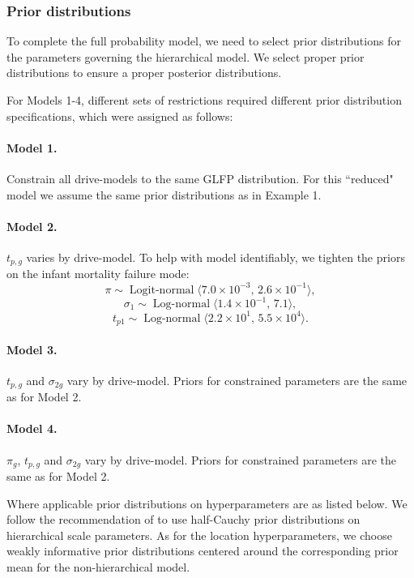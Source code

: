 \documentclass[aoas]{imsart}
\newcommand{\op}{\operatorname}
\begin{document}
\subsubsection{Prior distributions}
\label{sec:Prior distributions}
To complete the full probability model, we need to select prior distributions for the parameters governing the hierarchical model. We select proper prior distributions to ensure a proper posterior distributions.

For Models 1-4, different sets of restrictions required different prior distribution specifications, which were assigned as follows:

\paragraph{Model 1.} Constrain all drive-models to the same GLFP distribution. For this ``reduced" model we assume the same prior distributions as in Example 1.

\paragraph{Model 2.} $t_{p,g}$ varies by drive-model. To help with model identifiably, we tighten the priors on the infant mortality failure mode:
$$ \pi \sim \op{Logit-normal}\langle 7.0\times 10^{-3},\, 2.6 \times 10^{-1} \rangle,$$
$$\sigma_1 \sim \op{Log-normal}\langle 1.4 \times 10^{-1},\, 7.1\rangle,$$ 
$$t_{p1} \sim \op{Log-normal} \langle 2.2 \times 10^1,\, 5.5 \times 10^{4} \rangle.$$

\paragraph{Model 3.} $t_{p,g}$ and $\sigma_{2g}$ vary by drive-model. Priors for constrained parameters are the same as for Model 2.

\paragraph{Model 4.} $\pi_g$, $t_{p,g}$ and $\sigma_{2g}$ vary by drive-model. Priors for constrained parameters are the same as for Model 2.


Where applicable prior distributions on hyperparameters are as listed below. We follow the recommendation of \citet{gelman2014bayesian} to use half-Cauchy prior distributions on hierarchical scale parameters. As for the location hyperparameters, we choose weakly informative prior distributions centered around the corresponding prior mean for the non-hierarchical model.
\end{document}
